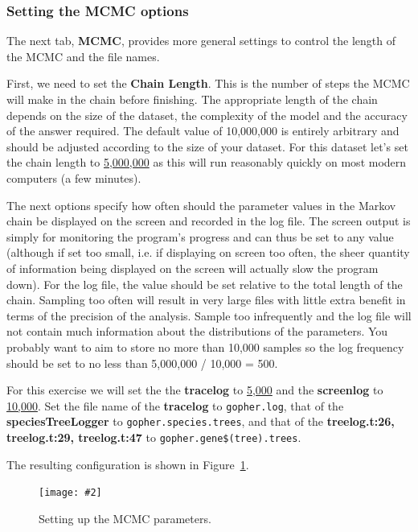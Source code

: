 \documentclass{article}
\newcommand{\includeimage}[2][]{%
\texttt{[image: \#2]}
}
\newcommand{\chainLength}{{5,000,000}}
\newcommand{\logEvery}{{5,000}}
\newcommand{\screenEvery}{{10,000}}
\begin{document}
\subsubsection{Setting the MCMC options}

The next tab, {\bf MCMC}, provides more general
settings to control the length of the MCMC and the file names. 

First, we need to set the {\bf Chain Length}. This is the number of
steps the MCMC will make in the chain before finishing. The appropriate length of the chain depends on the size of the dataset, the complexity of the
model and the accuracy of the answer required. The default value of 10,000,000
is entirely arbitrary and should be adjusted according to the size
of your dataset. For this dataset let's set the chain
length to \underline{\chainLength{}} as this will run reasonably quickly on most modern
computers (a few minutes).

The next options specify how often should the parameter values in the Markov chain be displayed on the screen and recorded in the log file.
The screen output is simply for monitoring the program's progress and can thus be set to any value (although if set too small, i.e. if displaying on screen too often, the sheer quantity of information being displayed on the screen will actually slow the program down). For the log file, the value should be set relative to the total length of the chain. Sampling too often will result in very large files with little extra benefit in terms of the precision of the analysis. Sample too infrequently and the log file will not contain much information about the distributions of the parameters. 
You probably want to aim to store no more than 10,000 samples so the log frequency should be set to no less than \chainLength{} / 10,000 = 500.

For this exercise we will set the the {\bf tracelog} to \underline{\logEvery{}} and the {\bf screenlog} to \underline{\screenEvery{}}. 
Set the file name of the {\bf tracelog} to \texttt{gopher.log}, that of the {\bf speciesTreeLogger} to \texttt{gopher.species.trees}, and that of the {\bf treelog.t:26, treelog.t:29, treelog.t:47} to \texttt{gopher.gene\$(tree).trees}.

The resulting configuration is shown in Figure~\ref{fig.MCMC}.

\begin{figure}[h]
\centering
\includeimage[width=\textwidth]{figures/BEAUti_MCMC}
\caption{\label{fig.MCMC} Setting up the MCMC parameters.}
\end{figure}
\end{document}
